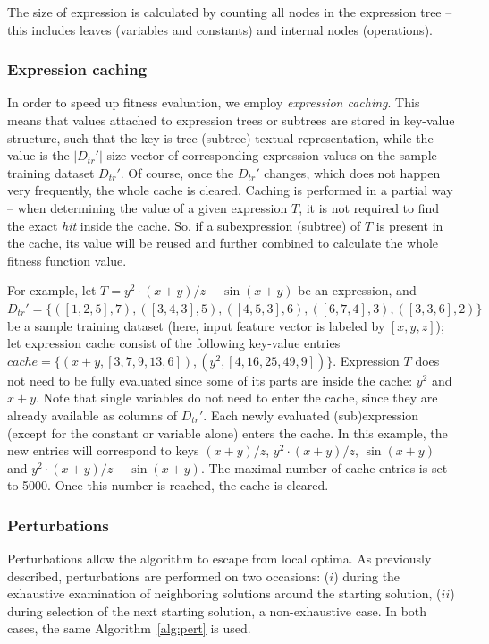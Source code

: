 \documentclass{bmcart}
\begin{document}
The size of expression is calculated by counting all nodes in the expression tree -- this includes leaves (variables and constants) and internal nodes (operations). 

\subsubsection{Expression caching}

In order to speed up fitness evaluation, we employ \emph{expression caching}. This means that values attached to expression trees or subtrees are stored in key-value structure, such that the key is tree (subtree) textual representation, while the value is the $|D_{tr}'|$-size  vector of corresponding expression values on the sample training dataset $D_{tr}'$. Of course, once the $D_{tr}'$ changes, which does not happen very frequently, the whole cache is cleared.
Caching is performed in a partial way -- when determining the value of a given expression $T$, it is not required to find the exact \emph{hit} inside the cache. So, if a subexpression (subtree) of $T$ is present in the cache, its value will be reused and further combined to calculate the whole fitness function value. 

For example, let  $T = y^2 \cdot (x+y)/z - \sin(x+y)$ be an expression, and $D_{tr}'=\{([1, 2, 5], 7), ([3, 4, 3], 5), ([4, 5, 3], 6), ([6, 7, 4], 3), ([3, 3, 6], 2)\}$ be a sample training dataset (here, input feature vector is labeled by $[x, y, z]$); let expression cache consist of the following key-value entries $cache=\{(x+y, [3, 7, 9, 13, 6]), (y^2, [4, 16, 25, 49, 9])\}$.  
Expression $T$ does not need to be fully evaluated since some of its parts are inside the cache: $y^2$ and $x+y$. Note that single variables do not need to enter the cache, since they are already available as columns of  $D_{tr}'$.
Each newly evaluated (sub)expression (except for the constant or variable alone) enters the cache. In this example, the new entries will correspond to keys $(x+y)/z$, $y^2 \cdot (x+y)/z$, $\sin(x+y)$ and $y^2 \cdot (x+y)/z - \sin(x+y)$.  
The maximal number of cache entries is set to 5000. Once this number is reached, the cache is cleared. 

\subsubsection{Perturbations}\label{sec:pertGen}

Perturbations allow the algorithm to escape from local optima. As previously described, perturbations are performed on two occasions: ($i$) during the exhaustive examination of neighboring solutions around the starting solution, ($ii$) during selection of the next starting solution, a non-exhaustive case.  
In both cases, the same Algorithm~\ref{alg:pert} is used. 
\end{document}
